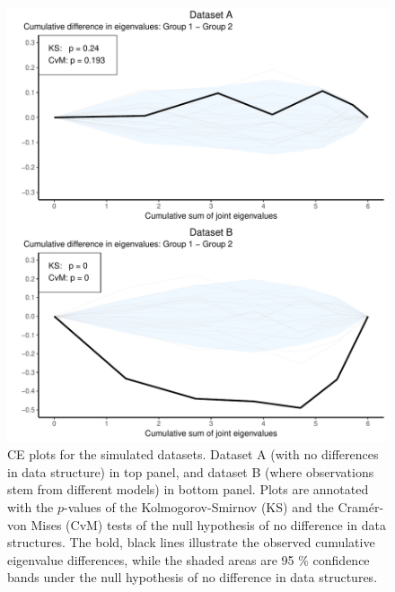 \documentclass[a4paper,12pt]{article}
\begin{document}
\begin{figure}[H]
\center
\includegraphics[scale=0.8]{Figure2_v2.pdf}
\caption{CE plots for the simulated datasets. Dataset A (with no differences in data structure) in top panel, and dataset B (where observations stem from different models) in bottom panel. Plots are annotated with the $p$-values of the Kolmogorov-Smirnov (KS) and the Cram\'er-von Mises (CvM) tests of the null hypothesis of no difference in data structures. The bold, black lines illustrate the observed cumulative eigenvalue differences, while the shaded areas are 95 \% confidence bands under the null hypothesis of no difference in data structures.}
\label{plot.simCE} 
\end{figure}
\end{document}
